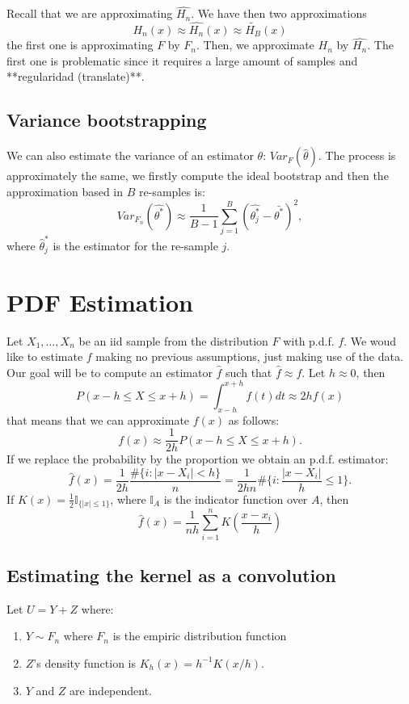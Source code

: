 Recall that we are approximating $\hat{H_n}$. We have then two approximations
\[
H_n(x) \approx \hat{H_n}(x) \approx \tilde{H_B}(x)
\]
the first one is approximating $F$ by $F_n$. Then, we approximate $H_n$ by $\hat{H_n}$. The first one is problematic since it requires a large amount of samples and **regularidad (translate)**.

\subsection{ Variance bootstrapping}

We can also estimate the variance of an estimator $\theta$: $Var_F(\hat \theta)$. The process is approximately the same, we firstly compute the ideal bootstrap and then the approximation based in $B$ re-samples is:
\[
Var_{F_n}(\hat{\theta^*}) \approx \frac{1}{B-1} \sum_{j=1}^B(\hat{\theta^*_j} - \bar{\theta^*})^2,
\]
where $\hat \theta^*_j$ is the estimator for the re-sample $j$.


\section{ PDF Estimation}


Let $X_1,\dots,X_n$ be an iid sample from the distribution $F$ with p.d.f. $f$. We woud like to estimate $f$ making no previous assumptions, just making use of the data. Our goal will be to compute an estimator $\hat f$ such that $\hat f \approx f$. Let $h \approx 0$, then
\[
P(x-h \leq X \leq x+h) = \int_{x-h}^{x+h} f(t) dt \approx 2hf(x)
\]
that means that we can approximate $f(x)$ as follows:
\[
f(x) \approx \frac{1}{2h} P(x-h \leq X \leq x+h).
\]
If we replace the probability by the proportion we obtain an p.d.f. estimator:
\[
\hat{f}(x) = \frac{1}{2h} \frac{\#\{i : |x-X_i|< h\}}{n} = \frac{1}{2hn}\#\{i : \frac{|x-X_i|}{h} \leq 1\}.
\]
If $K(x) = \frac{1}{2} \mathbb I_{\{|x| \leq 1\}}$, where $\mathbb I_A$ is the indicator function over $A$, then
\[
\hat{f}(x) = \frac{1}{nh} \sum_{i=1}^n K\left(\frac{x-x_i}{h}\right)
\]

\subsection{ Estimating the kernel as a convolution}

Let $U = Y+Z$ where:
\begin{enumerate}
\item $Y \sim F_n$ where $F_n$ is the empiric distribution function
\item $Z$'s density function is $K_h(x) = h^{-1}K(x/h)$.
\item $Y$ and $Z$ are independent.
\end{enumerate}

